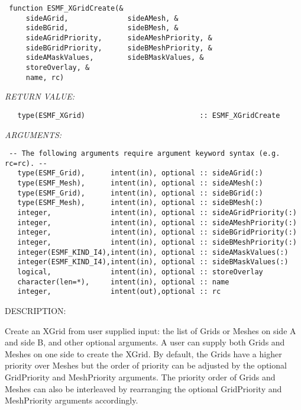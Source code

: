  
\begin{verbatim} 
 function ESMF_XGridCreate(&
     sideAGrid,              sideAMesh, &
     sideBGrid,              sideBMesh, &
     sideAGridPriority,      sideAMeshPriority, &
     sideBGridPriority,      sideBMeshPriority, &
     sideAMaskValues,        sideBMaskValues, &
     storeOverlay, &
     name, rc)\end{verbatim}{\em RETURN VALUE:}
\begin{verbatim}   type(ESMF_XGrid)                           :: ESMF_XGridCreate\end{verbatim}{\em ARGUMENTS:}
\begin{verbatim} -- The following arguments require argument keyword syntax (e.g. rc=rc). --
   type(ESMF_Grid),      intent(in), optional :: sideAGrid(:)
   type(ESMF_Mesh),      intent(in), optional :: sideAMesh(:)
   type(ESMF_Grid),      intent(in), optional :: sideBGrid(:)
   type(ESMF_Mesh),      intent(in), optional :: sideBMesh(:)
   integer,              intent(in), optional :: sideAGridPriority(:)
   integer,              intent(in), optional :: sideAMeshPriority(:)
   integer,              intent(in), optional :: sideBGridPriority(:)
   integer,              intent(in), optional :: sideBMeshPriority(:)
   integer(ESMF_KIND_I4),intent(in), optional :: sideAMaskValues(:)
   integer(ESMF_KIND_I4),intent(in), optional :: sideBMaskValues(:)
   logical,              intent(in), optional :: storeOverlay
   character(len=*),     intent(in), optional :: name
   integer,              intent(out),optional :: rc
 \end{verbatim}
{\sf DESCRIPTION:\\ }


        Create an XGrid from user supplied input: the list of Grids or Meshes on side A and side B, 
    and other optional arguments. A user can supply both Grids and Meshes on one side to create
    the XGrid. By default, the Grids have a higher priority over Meshes but the order of priority 
    can be adjusted by the optional GridPriority and MeshPriority arguments. The priority order
    of Grids and Meshes can also be interleaved by rearranging the optional 
    GridPriority and MeshPriority arguments accordingly.
    
